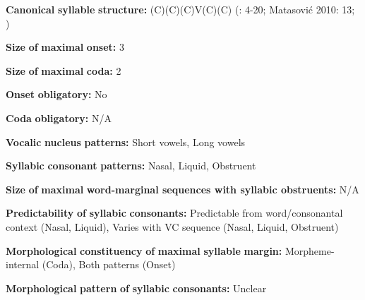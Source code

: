 \begin{styleBody}
\textbf{Canonical} \textbf{syllable} \textbf{structure:} (C)(C)(C)V(C)(C) (\citealt{Colarusso2006}: 4-20; Matasović 2010: 13; \citealt{Applebaum2013})
\end{styleBody}

\begin{styleBody}
\textbf{Size} \textbf{of} \textbf{maximal} \textbf{onset:} 3
\end{styleBody}

\begin{styleBody}
\textbf{Size} \textbf{of} \textbf{maximal} \textbf{coda:} 2
\end{styleBody}

\begin{styleBody}
\textbf{Onset} \textbf{obligatory:} No
\end{styleBody}

\begin{styleBody}
\textbf{Coda} \textbf{obligatory:} N/A
\end{styleBody}

\begin{styleBody}
\textbf{Vocalic} \textbf{nucleus} \textbf{patterns:} Short vowels, Long vowels
\end{styleBody}

\begin{styleBody}
\textbf{Syllabic} \textbf{consonant} \textbf{patterns:} Nasal, Liquid, Obstruent
\end{styleBody}

\begin{styleBody}
\textbf{Size} \textbf{of} \textbf{maximal} \textbf{word{}-marginal sequences with syllabic obstruents:} N/A
\end{styleBody}

\begin{styleBody}
\textbf{Predictability} \textbf{of} \textbf{syllabic} \textbf{consonants:} Predictable from word/consonantal context (Nasal, Liquid), Varies with VC sequence (Nasal, Liquid, Obstruent)
\end{styleBody}

\begin{styleBody}
\textbf{Morphological} \textbf{constituency} \textbf{of} \textbf{maximal} \textbf{syllable} \textbf{margin:} Morpheme-internal (Coda), Both patterns (Onset)
\end{styleBody}

\begin{styleBody}
\textbf{Morphological} \textbf{pattern} \textbf{of} \textbf{syllabic} \textbf{consonants:} Unclear
\end{styleBody}

